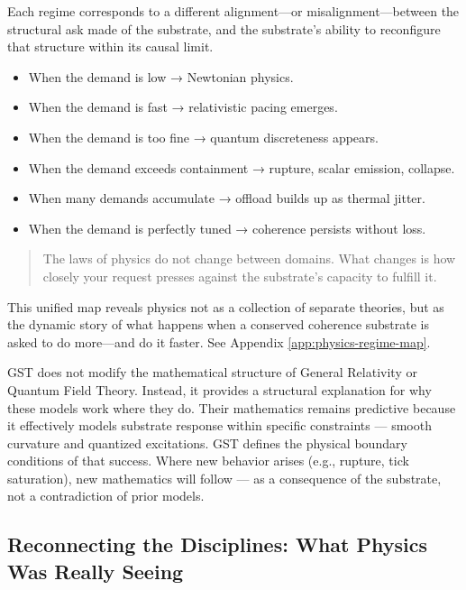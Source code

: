 \documentclass[entropy,article,submit,pdftex,moreauthors]{Definitions/mdpi}
\begin{document}
Each regime corresponds to a different alignment—or misalignment—between the structural ask made of the substrate, and the substrate’s ability to reconfigure that structure within its causal limit.

\begin{itemize}
    \item When the demand is low → Newtonian physics.
    \item When the demand is fast → relativistic pacing emerges.
    \item When the demand is too fine → quantum discreteness appears.
    \item When the demand exceeds containment → rupture, scalar emission, collapse.
    \item When many demands accumulate → offload builds up as thermal jitter.
    \item When the demand is perfectly tuned → coherence persists without loss.
\end{itemize}

\begin{quote}
The laws of physics do not change between domains. What changes is how closely your request presses against the substrate's capacity to fulfill it.
\end{quote}

This unified map reveals physics not as a collection of separate theories, but as the dynamic story of what happens when a conserved coherence substrate is asked to do more—and do it faster. See Appendix \ref{app:physics-regime-map}.


\begin{tcolorbox}[colback=gray!5, colframe=gray!60, title=Relation to Existing Theories]

GST does not modify the mathematical structure of General Relativity or Quantum Field Theory. Instead, it provides a structural explanation for why these models work where they do. Their mathematics remains predictive because it effectively models substrate response within specific constraints — smooth curvature and quantized excitations. GST defines the physical boundary conditions of that success. Where new behavior arises (e.g., rupture, tick saturation), new mathematics will follow — as a consequence of the substrate, not a contradiction of prior models.

\end{tcolorbox}


\subsection{Reconnecting the Disciplines: What Physics Was Really Seeing}
\end{document}
